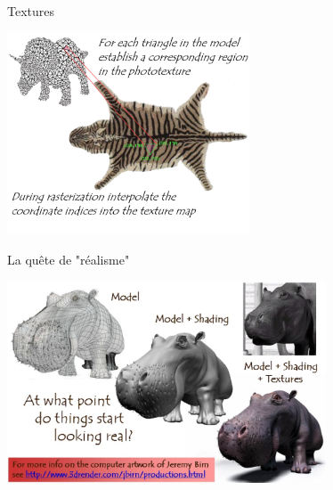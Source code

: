 \begin{frame}[t]{Textures}
  \begin{center}
    \includegraphics[height=6cm]{figs/textureex.png}
  \end{center}
\end{frame}
\begin{frame}[t]{La quête de "réalisme"}
  \begin{center}
    \includegraphics[height=6cm]{figs/textureex2.png}
  \end{center}
\end{frame}

